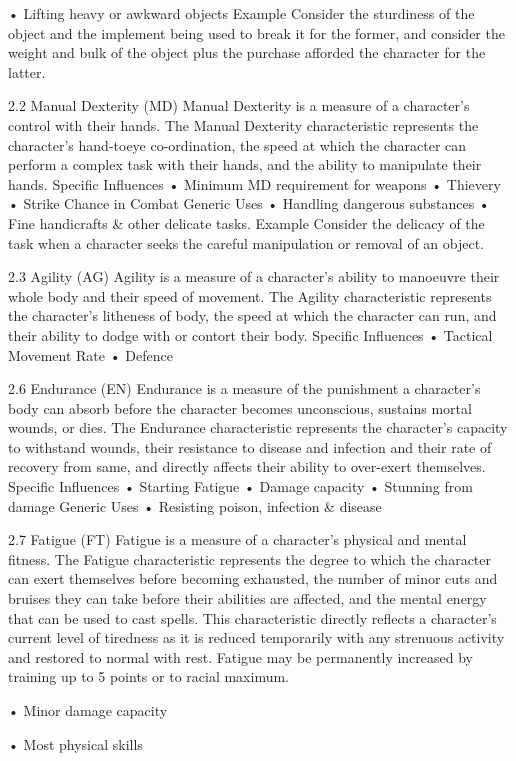 \documentclass[a4paper]{article}
\begin{document}
\begin{multicols}{3}
• Lifting heavy or awkward objects
Example
Consider the sturdiness of the object and
the implement being used to break it for the former, and
consider the weight and bulk of the object plus the purchase afforded the character for the latter.

2.2 Manual Dexterity (MD)
Manual Dexterity is a measure of a character’s
control with their hands. The Manual Dexterity
characteristic represents the character’s hand-toeye co-ordination, the speed at which the character
can perform a complex task with their hands, and
the ability to manipulate their hands.
Specific Influences
• Minimum MD requirement for weapons
• Thievery
• Strike Chance in Combat
Generic Uses
• Handling dangerous substances
• Fine handicrafts \& other delicate tasks.
Example
Consider the delicacy of the task when a
character seeks the careful manipulation or removal of an
object.

2.3 Agility (AG)
Agility is a measure of a character’s ability to
manoeuvre their whole body and their speed of
movement. The Agility characteristic represents
the character’s litheness of body, the speed at
which the character can run, and their ability to
dodge with or contort their body.
Specific Influences
• Tactical Movement Rate
• Defence

2.6 Endurance (EN)
Endurance is a measure of the punishment a character’s body can absorb before the character becomes unconscious, sustains mortal wounds, or
dies. The Endurance characteristic represents the
character’s capacity to withstand wounds, their
resistance to disease and infection and their rate of
recovery from same, and directly affects their
ability to over-exert themselves.
Specific Influences
• Starting Fatigue
• Damage capacity
• Stunning from damage
Generic Uses
• Resisting poison, infection \& disease

2.7 Fatigue (FT)
Fatigue is a measure of a character’s physical and
mental fitness. The Fatigue characteristic represents the degree to which the character can exert
themselves before becoming exhausted, the number of minor cuts and bruises they can take before
their abilities are affected, and the mental energy
that can be used to cast spells. This characteristic
directly reflects a character’s current level of tiredness as it is reduced temporarily with any strenuous
activity and restored to normal with rest. Fatigue
may be permanently increased by training up to 5
points or to racial maximum.

• Minor damage capacity

• Most physical skills


\end{multicols}
\end{document}
